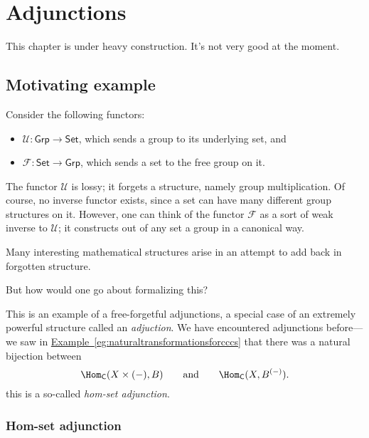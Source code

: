 \documentclass[main.tex]{subfiles}
\begin{document}
\chapter{Adjunctions}\label{sec:adjunctions}

\begin{note}
  This chapter is under heavy construction. It's not very good at the moment.
\end{note}

\section{Motivating example}
\label{sec:motivating_example}

Consider the following functors:
\begin{itemize}
  \item $\mathcal{U}\colon \mathsf{Grp} \rightarrow \mathsf{Set}$, which sends a group to its underlying set, and

  \item $\mathcal{F}\colon \mathsf{Set} \rightarrow \mathsf{Grp}$, which sends a set to the free group on it.
\end{itemize}

The functor $\mathcal{U}$ is lossy; it forgets a structure, namely group multiplication. Of course, no inverse functor exists, since a set can have many different group structures on it. However, one can think of the functor $\mathcal{F}$ as a sort of weak inverse to $\mathcal{U}$; it constructs out of any set a group in a canonical way.

Many interesting mathematical structures arise in an attempt to add back in forgotten structure.

But how would one go about formalizing this?

This is an example of a free-forgetful adjunctions, a special case of an extremely powerful structure called an \emph{adjuction}. We have encountered adjunctions before---we saw in \hyperref[eg:naturaltransformationsforcccs]{Example~\ref*{eg:naturaltransformationsforcccs}} that there was a natural bijection between
\begin{equation*}
  \Hom_{\mathsf{C}}(X \times (-), B)\qquad\text{and}\qquad \Hom_{\mathsf{C}}(X, B^{(-)}).
\end{equation*}
this is a so-called \emph{hom-set adjunction}.

\subsection{Hom-set adjunction}
\label{ssc:hom_set_adjunction}
\end{document}
